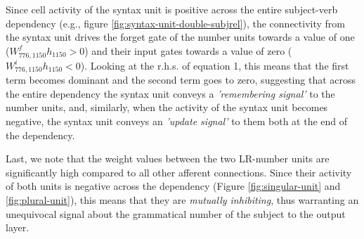 Since cell activity of the syntax unit is positive across the entire subject-verb dependency (e.g., figure \ref{fig:syntax-unit-double-subjrel}), the connectivity from the syntax unit drives the forget gate of the number units towards a value of one ($W^f_{776, 1150}h_{1150}>0$) and their input gates towards a value of zero ($W^i_{776, 1150}h_{1150}<0$). Looking at the r.h.s. of equation 1, this means that the first term becomes dominant and the second term goes to zero, suggesting that across the entire dependency the syntax unit conveys a \textit{'remembering signal'} to the number units, and, similarly, when the activity of the syntax unit becomes negative, the syntax unit conveys an \textit{'update signal'} to them both at the end of the dependency. 

Last, we note that the weight values between the two LR-number units are significantly high compared to all other afferent connections. Since their activity of both units is negative across the dependency (Figure \ref{fig:singular-unit} and \ref{fig:plural-unit}), this means that they are \textit{mutually inhibiting}, thus warranting an unequivocal signal about the grammatical number of the subject to the output layer.
